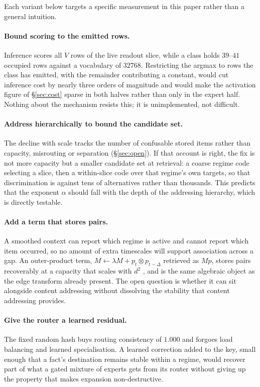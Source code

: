 \documentclass[11pt,a4paper]{article}
\begin{document}
Each variant below targets a specific measurement in this paper rather than a
general intuition.

\paragraph{Bound scoring to the emitted rows.}
Inference scores all $V$ rows of the live readout slice, while a class holds
$39$--$41$ occupied rows against a vocabulary of $32768$. Restricting the
argmax to rows the class has emitted, with the remainder contributing a
constant, would cut inference cost by nearly three orders of magnitude and
would make the activation figure of \S\ref{sec:cost} sparse in both halves
rather than only in the expert half. Nothing about the mechanism resists this;
it is unimplemented, not difficult.

\paragraph{Address hierarchically to bound the candidate set.}
The decline with scale tracks the number of confusable stored items rather than
capacity, misrouting or separation (\S\ref{sec:open}). If that account is
right, the fix is not more capacity but a smaller candidate set at retrieval:
a coarse regime code selecting a slice, then a within-slice code over that
regime's own targets, so that discrimination is against tens of alternatives
rather than thousands. This predicts that the exponent $\alpha$ should fall
with the depth of the addressing hierarchy, which is directly testable.

\paragraph{Add a term that stores pairs.}
A smoothed context can report which regime is active and cannot report which
item occurred, so no amount of extra timescales will support association across
a gap. An outer-product term, $M \leftarrow \lambda M + p_t \otimes p_{t-\Delta}$
retrieved as $Mp$, stores pairs recoverably at a capacity that scales with
$d^2$ \citep{ba2016using,schlag2021linear}, and is the same algebraic object as
the edge transform already present. The open question is whether it can sit
alongside content addressing without dissolving the stability that content
addressing provides.

\paragraph{Give the router a learned residual.}
The fixed random hash buys routing consistency of $1.000$ and forgoes load
balancing and learned specialisation. A learned correction added to the key,
small enough that a fact's destination remains stable within a regime, would
recover part of what a gated mixture of experts gets from its router
\citep{shazeer2017outrageously} without giving up the property that makes
expansion non-destructive.
\end{document}
